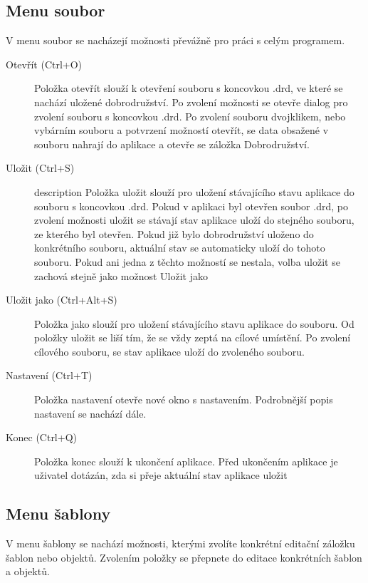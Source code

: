 \documentclass[12pt,a4paper,oneside]{article}
\begin{document}
	\subsection{Menu soubor}
	V menu soubor se nacházejí možnosti převážně pro práci s celým programem. 
	\begin{description}
		\item[Otevřít (Ctrl+O)] Položka otevřít slouží k otevření souboru s koncovkou .drd, ve které se nachází uložené dobrodružství. Po zvolení možnosti se otevře dialog pro zvolení souboru s koncovkou .drd. Po zvolení souboru dvojklikem, nebo vybárním souboru a potvrzení možností otevřít, se data obsažené v souboru nahrají do aplikace a otevře se záložka Dobrodružství.
		
		\item[Uložit (Ctrl+S)]
{description} Položka uložit slouží pro uložení stávajícího stavu aplikace do souboru s koncovkou .drd. Pokud v aplikaci byl otevřen soubor .drd, po zvolení možnosti uložit se stávají stav aplikace uloží do stejného souboru, ze kterého byl otevřen. Pokud již bylo dobrodružství uloženo do konkrétního souboru, aktuální stav se automaticky uloží do tohoto souboru. Pokud ani jedna z těchto možností se nestala, volba uložit se zachová stejně jako možnost Uložit jako
	
		\item[Uložit jako (Ctrl+Alt+S)] Položka jako slouží pro uložení stávajícího stavu aplikace do souboru. Od položky uložit se liší tím, že se vždy zeptá na cílové umístění. Po zvolení cílového souboru, se stav aplikace uloží do zvoleného souboru. 
		
		\item[Nastavení (Ctrl+T)] Položka nastavení otevře nové okno s nastavením. Podrobnější popis nastavení se nachází dále.
		
		\item[Konec (Ctrl+Q)] Položka konec slouží k ukončení aplikace. Před ukončením aplikace je uživatel dotázán, zda si přeje aktuální stav aplikace uložit
		
	\end{description}
	
	\subsection{Menu šablony}
	V menu šablony se nachází možnosti, kterými zvolíte konkrétní editační záložku šablon nebo objektů. Zvolením položky se přepnete do editace konkrétních šablon a objektů.
	
\end{document}
